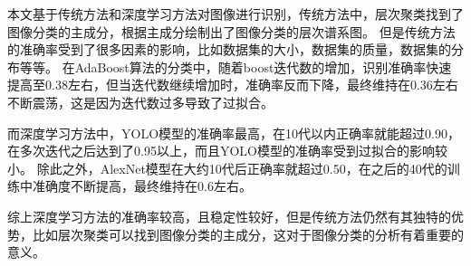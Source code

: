 本文基于传统方法和深度学习方法对图像进行识别，传统方法中，层次聚类找到了图像分类的主成分，根据主成分绘制出了图像分类的层次谱系图。
但是传统方法的准确率受到了很多因素的影响，比如数据集的大小，数据集的质量，数据集的分布等等。
在AdaBoost算法的分类中，随着boost迭代数的增加，识别准确率快速提高至0.38左右，但当迭代数继续增加时，准确率反而下降，最终维持在0.36左右不断震荡，这是因为迭代数过多导致了过拟合。 \par

而深度学习方法中，YOLO模型的准确率最高，在10代以内正确率就能超过0.90，在多次迭代之后达到了0.95以上，而且YOLO模型的准确率受到过拟合的影响较小。
除此之外，AlexNet模型在大约10代后正确率就超过0.50，在之后的40代的训练中准确度不断提高，最终维持在0.6左右。 \par

综上深度学习方法的准确率较高，且稳定性较好，但是传统方法仍然有其独特的优势，比如层次聚类可以找到图像分类的主成分，这对于图像分类的分析有着重要的意义。 \par